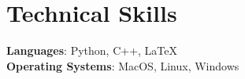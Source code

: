\section{Technical Skills}
 \begin{itemize}[leftmargin=0.15in, label={}]
    \small{\item{
     \textbf{Languages}{: Python, C++, LaTeX} \\
      \textbf{Operating Systems}{: MacOS, Linux, Windows} \\
    }}
 \end{itemize}